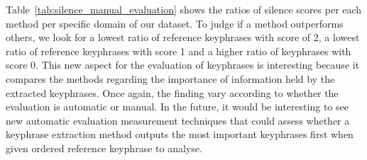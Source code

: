         Table~\ref{tab:silence_manual_evaluation} shows the ratios of silence scores per each method per specific domain of our dataset.
        To judge if a method outperforms others, we look for a lowest ratio of reference keyphrases with score of 2, a lowest ratio of reference keyphrases with score 1 and a higher ratio of keyphrases with score 0.
        This new aspect for the evaluation of keyphrases is interesting because it compares the methods regarding the importance of information held by the extracted keyphrases.
        Once again, the finding vary according to whether the evaluation is automatic or manual.
        In the future, it would be interesting to see new automatic evaluation measurement techniques that could assess whether a keyphrase extraction method outputs the most important keyphrases first when given ordered reference keyphrase to analyse.
        \begin{table*}[t]
            \caption{
                Silence ratios of TF-IDF, KEA and TopicRank on each specific domain
                \label{tab:silence_manual_evaluation}
            }
        \end{table*}

